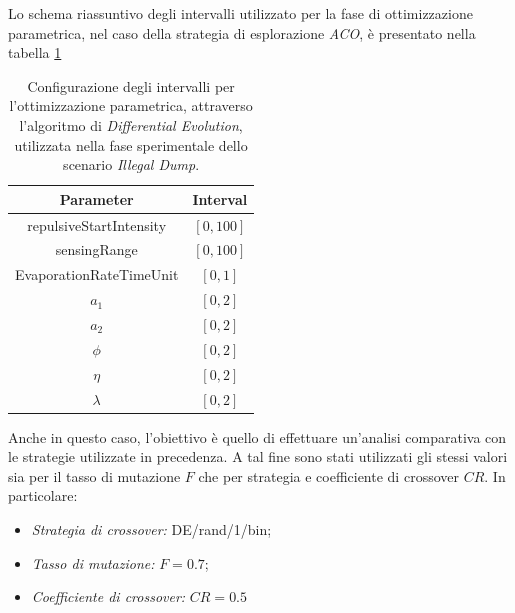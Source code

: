 Lo schema riassuntivo degli intervalli utilizzato per la fase di ottimizzazione parametrica, nel caso della strategia di esplorazione \textit{ACO}, è presentato nella tabella \ref{tabella_intervalli_dump_ACO}

\begin{table}[H]
    \centering
    \captionsetup{justification=centering, margin=2cm, font=footnotesize}
    \begin{tabular}{|c|c|}
    \hline
    \textbf{Parameter}              & \textbf{Interval}         \\ \hline
    repulsiveStartIntensity         & $[0,100]$                 \\ \hline
    sensingRange                    & $[0,100]$                 \\ \hline
    EvaporationRateTimeUnit         & $[0,1]$                   \\ \hline
    $a_{1}$                         & $[0,2]$                   \\ \hline
    $a_{2}$                         & $[0,2]$                   \\ \hline
    $\phi$                          & $[0,2]$                   \\ \hline
    $\eta$                          & $[0,2]$                   \\ \hline
    $\lambda$                       & $[0,2]$                   \\ \hline
    \end{tabular}%
    
    \caption{Configurazione degli intervalli per l'ottimizzazione parametrica, attraverso l'algoritmo di \textit{Differential Evolution}, utilizzata nella fase sperimentale dello scenario \textit{Illegal Dump}.}
    \label{tabella_intervalli_dump_ACO}
\end{table}

Anche in questo caso, l'obiettivo è quello di effettuare un'analisi comparativa con le strategie utilizzate in precedenza.
A tal fine sono stati utilizzati gli stessi valori sia per il tasso di mutazione $F$ che per strategia e coefficiente di crossover $CR$.
In particolare:
\begin{itemize}
    \item \textit{Strategia di crossover:} DE/rand/1/bin;
    \item \textit{Tasso di mutazione:} $F=0.7$;
    \item \textit{Coefficiente di crossover:} $CR=0.5$
\end{itemize}


